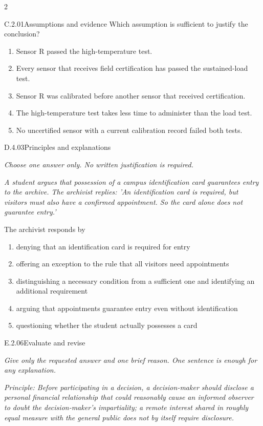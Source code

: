 \documentclass[9pt]{extarticle}
\newcommand{\choice}[1]{\item #1}
\begin{document}
\begin{multicols}{2}
\begin{DenseCoreProblem}{C.2.01}{Assumptions and evidence}
Which assumption is sufficient to justify the conclusion?
\begin{enumerate}[label=(\alph*)]
  \choice{Sensor R passed the high-temperature test.}
  \choice{Every sensor that receives field certification has passed the sustained-load test.}
  \choice{Sensor R was calibrated before another sensor that received certification.}
  \choice{The high-temperature test takes less time to administer than the load test.}
  \choice{No uncertified sensor with a current calibration record failed both tests.}
\end{enumerate}
\end{DenseCoreProblem}
\begin{DenseCoreProblem}{D.4.03}{Principles and explanations}
{\scriptsize\textit{Choose one answer only. No written justification is required.}\par}
\emph{A student argues that possession of a campus identification card guarantees entry to the archive. The archivist replies: 'An identification card is required, but visitors must also have a confirmed appointment. So the card alone does not guarantee entry.'}

The archivist responds by
\begin{enumerate}[label=(\alph*)]
  \choice{denying that an identification card is required for entry}
  \choice{offering an exception to the rule that all visitors need appointments}
  \choice{distinguishing a necessary condition from a sufficient one and identifying an additional requirement}
  \choice{arguing that appointments guarantee entry even without identification}
  \choice{questioning whether the student actually possesses a card}
\end{enumerate}
\end{DenseCoreProblem}
\begin{DenseCoreProblem}{E.2.06}{Evaluate and revise}
{\scriptsize\textit{Give only the requested answer and one brief reason. One sentence is enough for any explanation.}\par}
\emph{Principle: Before participating in a decision, a decision-maker should disclose a personal financial relationship that could reasonably cause an informed observer to doubt the decision-maker's impartiality; a remote interest shared in roughly equal measure with the general public does not by itself require disclosure.}


\end{DenseCoreProblem}
\end{multicols}
\end{document}
